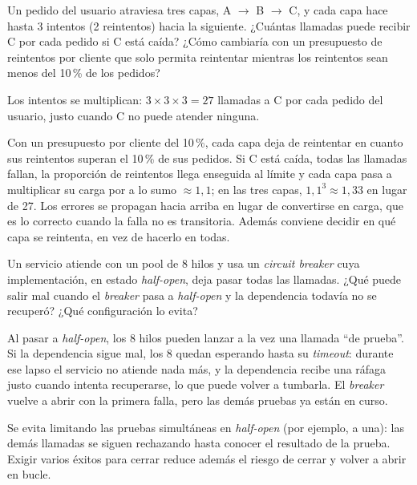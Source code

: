 \documentclass[variant=guia,cover=institutional,mode=screen]{ua-engineering-v6-article}
\begin{document}
\begin{uaexercise}
Un pedido del usuario atraviesa tres capas, A $\to$ B $\to$ C, y cada capa hace hasta 3 intentos (2 reintentos) hacia la siguiente. ¿Cuántas llamadas puede recibir C por cada pedido si C está caída? ¿Cómo cambiaría con un presupuesto de reintentos por cliente que solo permita reintentar mientras los reintentos sean menos del 10\,\% de los pedidos?
\end{uaexercise}
\begin{uaanswer}
Los intentos se multiplican: $3 \times 3 \times 3 = 27$ llamadas a C por cada pedido del usuario, justo cuando C no puede atender ninguna.

Con un presupuesto por cliente del 10\,\%, cada capa deja de reintentar en cuanto sus reintentos superan el 10\,\% de sus pedidos. Si C está caída, todas las llamadas fallan, la proporción de reintentos llega enseguida al límite y cada capa pasa a multiplicar su carga por a lo sumo $\approx 1{,}1$; en las tres capas, $1{,}1^3 \approx 1{,}33$ en lugar de 27. Los errores se propagan hacia arriba en lugar de convertirse en carga, que es lo correcto cuando la falla no es transitoria. Además conviene decidir en qué capa se reintenta, en vez de hacerlo en todas.
\end{uaanswer}

\begin{uaexercise}
Un servicio atiende con un pool de 8 hilos y usa un \emph{circuit breaker} cuya implementación, en estado \emph{half-open}, deja pasar todas las llamadas. ¿Qué puede salir mal cuando el \emph{breaker} pasa a \emph{half-open} y la dependencia todavía no se recuperó? ¿Qué configuración lo evita?
\end{uaexercise}
\begin{uaanswer}
Al pasar a \emph{half-open}, los 8 hilos pueden lanzar a la vez una llamada ``de prueba''. Si la dependencia sigue mal, los 8 quedan esperando hasta su \emph{timeout}: durante ese lapso el servicio no atiende nada más, y la dependencia recibe una ráfaga justo cuando intenta recuperarse, lo que puede volver a tumbarla. El \emph{breaker} vuelve a abrir con la primera falla, pero las demás pruebas ya están en curso.

Se evita limitando las pruebas simultáneas en \emph{half-open} (por ejemplo, a una): las demás llamadas se siguen rechazando hasta conocer el resultado de la prueba. Exigir varios éxitos para cerrar reduce además el riesgo de cerrar y volver a abrir en bucle.
\end{uaanswer}
\end{document}
